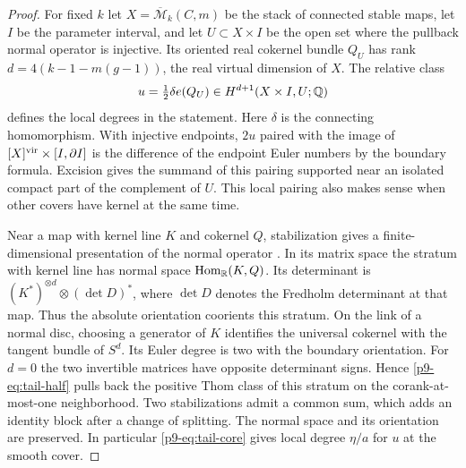 \begin{proof}
For fixed $k$ let $X=\overline{\mathcal M}_k(C,m)$ be the stack of
connected stable maps, let $I$ be the parameter interval, and let
$U\subset X\times I$ be the open set where the pullback normal operator
is injective. Its oriented real cokernel bundle $Q_U$ has rank
$d=4(k-1-m(g-1))$, the real virtual dimension of $X$. The relative class
\begin{equation}\label{p9-eq:tail-half}
 u=\tfrac12\delta e(Q_U)\in H^{d+1}(X\times I,U;\mathbb Q)
\end{equation}
defines the local degrees in the statement. Here $\delta$ is the
connecting homomorphism. With injective endpoints,
$2u$ paired with the image of $[X]^{\rm vir}\times[I,\partial I]$
is the difference of the endpoint Euler numbers by the boundary formula.
Excision gives the summand of this pairing supported near an isolated
compact part of the complement of $U$. This local pairing also makes
sense when other covers have kernel at the same time.

Near a map with kernel line $K$ and cokernel $Q$, stabilization gives
a finite-dimensional presentation of the normal operator
\cite[\S6.1 and Appendix~B, (B.8)]{bai}. In its matrix space the
stratum with kernel line has normal space $\operatorname{Hom}_{\mathbb R}(K,Q)$.
Its determinant is $(K^*)^{\otimes d}\otimes(\det D)^*$, where $\det D$
denotes the Fredholm determinant at that map. Thus the absolute
orientation coorients this stratum. On the link of a normal disc,
choosing a generator of $K$ identifies the universal cokernel with
the tangent bundle of $S^d$. Its Euler degree is two with the boundary
orientation. For $d=0$ the two invertible matrices have opposite
determinant signs. Hence \eqref{p9-eq:tail-half} pulls back the positive
Thom class of this stratum on the corank-at-most-one neighborhood.
Two stabilizations admit a common sum, which adds an identity block
after a change of splitting. The normal space and its orientation are
preserved. In particular \eqref{p9-eq:tail-core} gives local degree
$\eta/a$ for $u$ at the smooth cover.


\end{proof}
